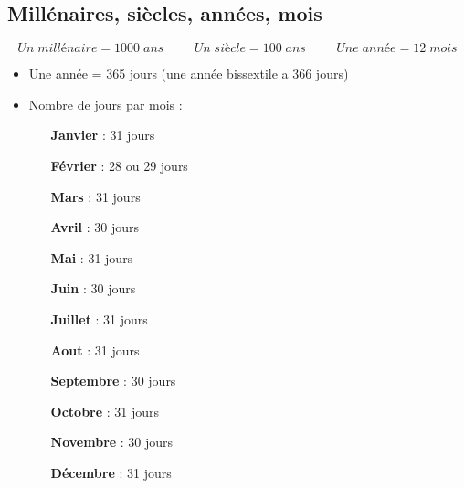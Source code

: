 \begin{pageCours} 

\section{Millénaires, siècles, années, mois}

\begin{Def}
\[Un\;millénaire = 1000 \;ans \hspace{1cm} Un\; siècle = 100\; ans \hspace{1cm} Une\; année = 12 \;mois\]
\end{Def}


\begin{Def}
\begin{itemize}
\item Une année = 365 jours (une année bissextile a 366 jours)
\item Nombre de jours par mois :

\begin{minipage}{.3\linewidth}
\begin{itemize}
\item[\textbf{Janvier}] : 31 jours
\item[\textbf{Février}]  : 28 ou 29 jours
\item[\textbf{Mars}] : 31 jours
\item[\textbf{Avril}] : 30 jours
\end{itemize}
\end{minipage}
\begin{minipage}{.3\linewidth}
\begin{itemize}
\item[\textbf{Mai}] : 31 jours
\item[\textbf{Juin}]  : 30 jours
\item[\textbf{Juillet}] : 31 jours
\item[\textbf{Aout}] : 31 jours
\end{itemize}
\end{minipage}
\begin{minipage}{.3\linewidth}
\begin{itemize}
\item[\textbf{Septembre}] : 30 jours
\item[\textbf{Octobre}]  : 31 jours
\item[\textbf{Novembre}] : 30 jours
\item[\textbf{Décembre}] : 31 jours
\end{itemize}
\end{minipage}
\end{itemize}
\end{Def}


\end{pageCours}
